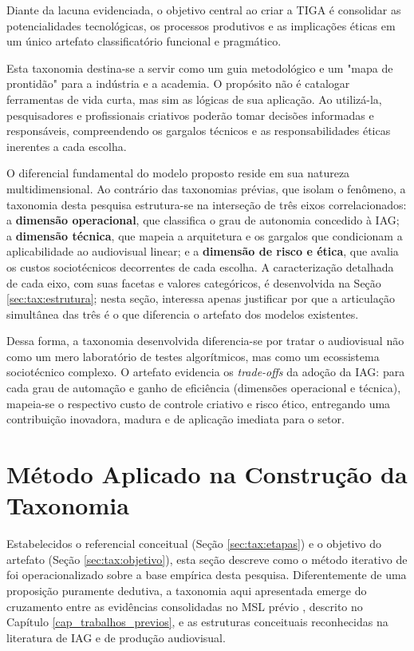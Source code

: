 Diante da lacuna evidenciada, o objetivo central ao criar a TIGA é consolidar as potencialidades tecnológicas, os processos produtivos e as implicações éticas em um único artefato classificatório funcional e pragmático. 

Esta taxonomia destina-se a servir como um guia metodológico e um "mapa de prontidão" para a indústria e a academia. O propósito não é catalogar ferramentas de vida curta, mas sim as lógicas de sua aplicação. Ao utilizá-la, pesquisadores e profissionais criativos poderão tomar decisões informadas e responsáveis, compreendendo os gargalos técnicos e as responsabilidades éticas inerentes a cada escolha.

O diferencial fundamental do modelo proposto reside em sua natureza multidimensional. Ao contrário das taxonomias prévias, que isolam o fenômeno, a taxonomia desta pesquisa estrutura-se na interseção de três eixos correlacionados: a \textbf{dimensão operacional}, que classifica o grau de autonomia concedido à IAG; a \textbf{dimensão técnica}, que mapeia a arquitetura e os gargalos que condicionam a aplicabilidade ao audiovisual linear; e a \textbf{dimensão de risco e ética}, que avalia os custos sociotécnicos decorrentes de cada escolha. A caracterização detalhada de cada eixo, com suas facetas e valores categóricos, é desenvolvida na Seção \ref{sec:tax:estrutura}; nesta seção, interessa apenas justificar por que a articulação simultânea das três é o que diferencia o artefato dos modelos existentes.

Dessa forma, a taxonomia desenvolvida diferencia-se por tratar o audiovisual não como um mero laboratório de testes algorítmicos, mas como um ecossistema sociotécnico complexo. O artefato evidencia os \textit{trade-offs} da adoção da IAG: para cada grau de automação e ganho de eficiência (dimensões operacional e técnica), mapeia-se o respectivo custo de controle criativo e risco ético, entregando uma contribuição inovadora, madura e de aplicação imediata para o setor.

\section{Método Aplicado na Construção da Taxonomia}

Estabelecidos o referencial conceitual (Seção \ref{sec:tax:etapas}) e o objetivo do artefato (Seção \ref{sec:tax:objetivo}), esta seção descreve como o método iterativo de \citet{nickerson2013method} foi operacionalizado sobre a base empírica desta pesquisa. Diferentemente de uma proposição puramente dedutiva, a taxonomia aqui apresentada emerge do cruzamento entre as evidências consolidadas no MSL prévio \citep{RothAleo2026}, descrito no Capítulo \ref{cap_trabalhos_previos}, e as estruturas conceituais reconhecidas na literatura de IAG e de produção audiovisual.

